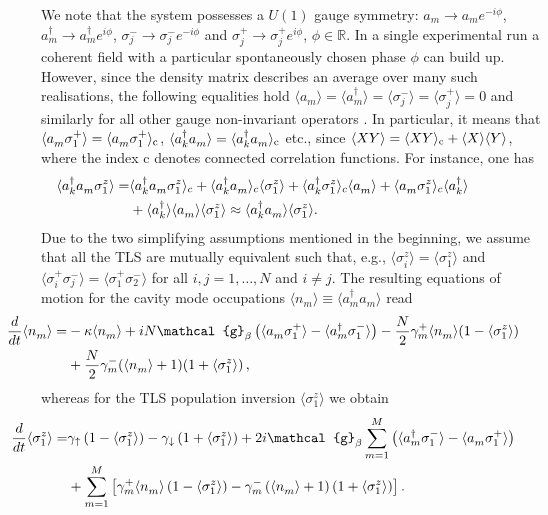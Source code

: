 \documentclass[12pt, a4paper]{iopart}
\newcommand{\avg}[1]{\langle{#1}\rangle}
\begin{document}
We note that the system possesses a $U(1)$ gauge symmetry: $a^{}_m\to a^{}_m e^{-i\phi}$, $a^\dag_m\to a^\dag_m e^{i\phi}$, $\sigma^-_j\to \sigma^-_j e^{-i\phi}$ and $\sigma^+_j\to \sigma^+_j e^{i\phi}$, $\phi\in\mathbb{R}$. In a single experimental run a coherent field with a particular spontaneously chosen phase $\phi$ can build up. However, since the density matrix describes an average over many such realisations, the following equalities hold $\avg{a_m^{}}=\avg{a_m^\dag}=\avg{\sigma^-_j}= \avg{\sigma^+_j}=0$ and similarly for all other gauge non-invariant operators \cite{PRA.82.033810}. In particular, it means that $\avg{a_m^{}\sigma^+_1}= \avg{a_m^{}\sigma^+_1}_{\rm c}$, $\avg{a^\dag_k a_m^{}}=\avg{a^\dag_k a_m^{}}_{\rm c}$ etc., since $\avg{XY}=\avg{XY}_{\rm c}+\avg{X}\avg{Y}$, where the index c denotes connected correlation functions. For instance, one has
%
\begin{eqnarray}
\hspace*{-1.5cm}
\avg{a^\dag_k a_m^{} \sigma^z_1} = &\avg{a^\dag_k a_m^{}\sigma^z_1}_c + \avg{a^\dag_k a_m^{}}_c \avg{\sigma^z_1} + \avg{a^\dag_k \sigma^z_1}_c \avg{a_m^{}}+\avg{a_m^{} \sigma^z_1}_c \avg{a^\dag_k}\nonumber\\
 \hspace*{-1.5cm}
 &+ \avg{a^\dag_k}\avg{a_m^{}}\avg{\sigma^z_1} \approx \avg{a^\dag_k a_m^{}} \avg{\sigma^z_1}.
\end{eqnarray}
%
{Due to the two simplifying assumptions mentioned in the beginning,} we assume that all the TLS are mutually equivalent such that, e.g., $\avg{\sigma^z_i}=\avg{\sigma^z_1}$ and $\avg{\sigma^+_i\sigma^-_j}=\avg{\sigma^+_1\sigma^-_2}$ for all $i,j=1,\ldots,N$ and $i\neq j$. The resulting equations of motion
for the cavity mode occupations $\avg{n_m^{}}\equiv\avg{a^\dag_m a_m^{}}$ read
%
\begin{eqnarray}
\hspace*{-1.5cm}
\frac{d}{dt}\avg{n_m^{}}=&-\kappa\avg{n_m^{}}+iN \mathcal{g}_\beta\left(\avg{a_m^{}\sigma^+_1}-\avg{a^\dag_m\sigma^-_1}\right)
-\frac{N}{2}\gamma^+_m\avg{n_m^{}}(1-\avg{\sigma^z_1})
 \nonumber\\\hspace*{-1.5cm}
&+\frac{N}{2}\gamma^-_m(\avg{n_m^{}}+1)(1+\avg{\sigma^z_1})\,,\label{eq:MainSys-1}
\end{eqnarray}
%
whereas for the TLS population inversion $\avg{\sigma^z_1}$ we obtain
%
\begin{eqnarray}
\hspace*{-1.5cm}
\frac{d}{dt}\avg{\sigma^z_1}=&\gamma_\uparrow\left(1-\avg{\sigma^z_1}\right)
-\gamma_\downarrow\left(1+\avg{\sigma^z_1}\right)
+2i\mathcal{g}_\beta\sum_{m=1}^M\left(\avg{a^\dag_m\sigma^-_1}
-\avg{a_m^{}\sigma^+_1}\right)
\nonumber\\\hspace*{-2.0cm}
&+\sum_{m=1}^M\left[\gamma^+_m\avg{n_m^{}}\left(1-\avg{\sigma^z_1}\right)-\gamma^-_m\left(\avg{n_m^{}}+1\right)\left(1+\avg{\sigma^z_1}\right)\right].\label{eq:MainSys-2}
\end{eqnarray}
\end{document}
